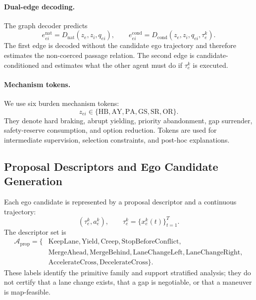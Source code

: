 \documentclass[10pt]{article}
\begin{document}
\paragraph{Dual-edge decoding.}
The graph decoder predicts
\begin{equation}
    e^{\mathrm{nat}}_{ei}
    =
    D_{\mathrm{nat}}(z_e,z_i,q_{ei}),
    \qquad
    e^{\mathrm{cond}}_{ei}
    =
    D_{\mathrm{cond}}(z_e,z_i,q_{ei},\tau^k_e).
\end{equation}
The first edge is decoded without the candidate ego trajectory and therefore estimates the non-coerced passage relation. The second edge is candidate-conditioned and estimates what the other agent must do if $\tau^k_e$ is executed.

\paragraph{Mechanism tokens.}
We use six burden mechanism tokens:
\begin{equation}
    z_{ei}\in
    \{
    \mathrm{HB},
    \mathrm{AY},
    \mathrm{PA},
    \mathrm{GS},
    \mathrm{SR},
    \mathrm{OR}
    \}.
\end{equation}
They denote hard braking, abrupt yielding, priority abandonment, gap surrender, safety-reserve consumption, and option reduction. Tokens are used for intermediate supervision, selection constraints, and post-hoc explanations.

\subsection{Proposal Descriptors and Ego Candidate Generation}
\label{app:ego_candidates}

Each ego candidate is represented by a proposal descriptor and a continuous trajectory:
\begin{equation}
    (\tau^k_e,a^k_e), \qquad
    \tau^k_e=\{x^k_e(t)\}_{t=1}^{T}.
\end{equation}
The descriptor set is
\begin{equation}
\begin{aligned}
    \mathcal{A}_{\mathrm{prop}}
    =
    \{
    &\mathrm{KeepLane},
    \mathrm{Yield},
    \mathrm{Creep},
    \mathrm{StopBeforeConflict},\\
    &\mathrm{MergeAhead},
    \mathrm{MergeBehind},
    \mathrm{LaneChangeLeft},
    \mathrm{LaneChangeRight},\\
    &\mathrm{AccelerateCross},
    \mathrm{DecelerateCross}
    \}.
\end{aligned}
\end{equation}
These labels identify the primitive family and support stratified analysis; they do not certify that a lane change exists, that a gap is negotiable, or that a maneuver is map-feasible.
\end{document}
